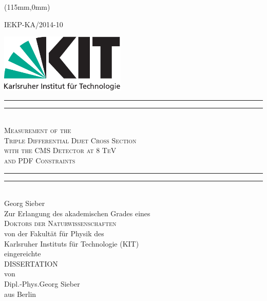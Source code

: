 \begin{titlepage}
    \begin{center}
        \begin{textblock*}{5cm}(115mm,0mm)
            \begin{flushright}
                \small
                IEKP-KA/2014-10
            \end{flushright}
        \end{textblock*}
        \includegraphics[width=6.0cm]{figures/Kitlogo_de_cmyk}
        \vspace*{3cm}

        \vspace*{\baselineskip}
        \rule{\textwidth}{1.6pt}\vspace*{-\baselineskip}\vspace*{2pt}
        \rule{\textwidth}{0.4pt}\\[\baselineskip]
        \LARGE{\textsc{Measurement of the\\
            Triple Differential Dijet Cross Section\\
            with the CMS Detector at 8 TeV\\
            and PDF Constraints}}\\
        \rule{\textwidth}{0.4pt}\vspace*{-\baselineskip}\vspace{3.2pt}
        \rule{\textwidth}{1.6pt}\\[\baselineskip]
        \LARGE{Georg Sieber}\\
        \vspace{3ex}
        \Large Zur Erlangung des akademischen Grades eines\\[1.5ex]
        \textsc{Doktors der Naturwissenschaften}\\[1.5ex]
            von der Fakult\"at f\"ur Physik des\\
        Karlsruher Instituts f\"ur Technologie (KIT)\\ 
        \vspace{1ex}
        eingereichte\\
        \vspace{1ex}
        DISSERTATION\\
        \vspace{1ex}
        von\\
        \vspace{1ex}
        Dipl.-Phys.\;Georg Sieber\\aus Berlin\\
        \vspace{1.5 cm}


\end{center}
\end{titlepage}
